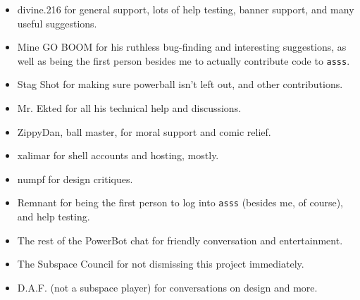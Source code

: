 \documentclass{article}
\newcommand{\asss}{\texttt{asss}}
\begin{document}
\begin{itemize}

\item{divine.216} for general support, lots of help testing, banner
support, and many useful suggestions.

\item{Mine GO BOOM} for his ruthless bug-finding and interesting
suggestions, as well as being the first person besides me to actually
contribute code to \asss{}.

\item{Stag Shot} for making sure powerball isn't left out, and other
contributions.

\item{Mr. Ekted} for all his technical help and discussions.

\item{ZippyDan}, ball master, for moral support and comic relief.

\item{xalimar} for shell accounts and hosting, mostly.

\item{numpf} for design critiques. %

\item{Remnant} for being the first person to log into \asss{} (besides
me, of course), and help testing.

\item{The rest of the PowerBot chat} for friendly conversation and
entertainment.

\item{The Subspace Council} for not dismissing this project immediately.


\item{D.A.F. (not a subspace player)} for conversations on design and
more.

\end{itemize}
\end{document}
